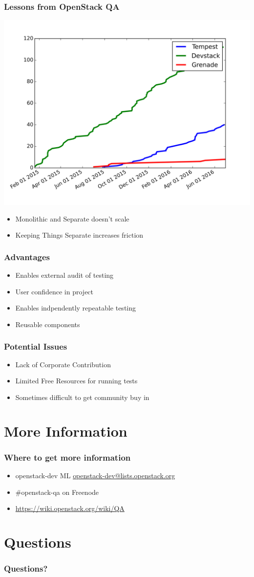 \documentclass[aspectratio=43,11pt,hyperref={colorlinks=true}]{beamer}
\begin{document}
\begin{frame}
    \frametitle{Lessons from OpenStack QA}
    \begin{center}
        \includegraphics[width=.6\textwidth]{plugins.png}
    \end{center}
    \begin{itemize}
        \item Monolithic and Separate doesn't scale
        \item Keeping Things Separate increases friction
    \end{itemize}
\end{frame}

\begin{frame}
    \frametitle{Advantages}
    \begin{itemize}
        \item Enables external audit of testing
        \item User confidence in project
        \item Enables indpendently repeatable testing
        \item Reusable components
    \end{itemize}
\end{frame}

\begin{frame}
    \frametitle{Potential Issues}
    \begin{itemize}
        \item Lack of Corporate Contribution 
        \item Limited Free Resources for running tests
        \item Sometimes difficult to get community buy in
    \end{itemize}
\end{frame}

\section{More Information}
\begin{frame}
\frametitle{Where to get more information}
    \begin{itemize}
        \item openstack-dev ML\: \href{mailto:openstack-dev@lists.openstack.org}{openstack-dev@lists.openstack.org}
        \item \#openstack-qa on Freenode
        \item \href{https://wiki.openstack.org/wiki/QA}{https://wiki.openstack.org/wiki/QA}
    \end{itemize}
\end{frame}

\section{Questions}
\begin{frame}
\frametitle{Questions?}
\end{frame}
\end{document}

